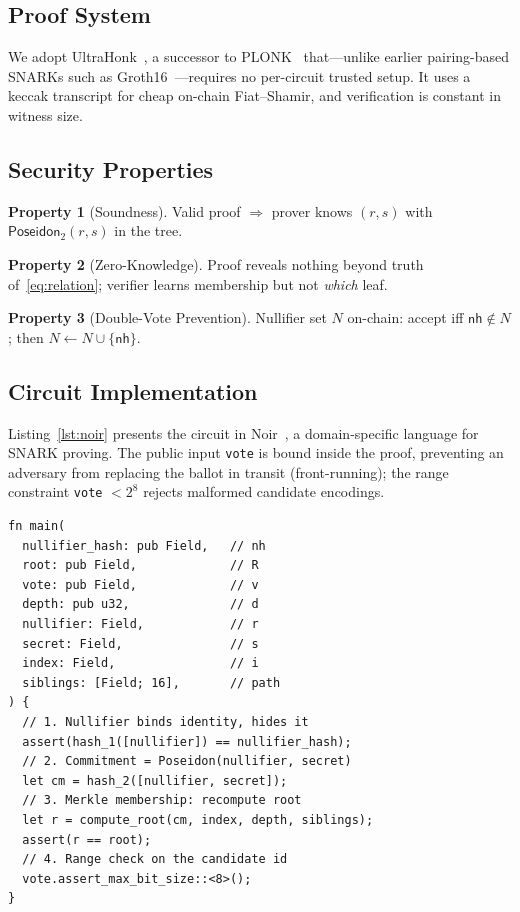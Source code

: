 \documentclass[conference]{IEEEtran}
\theoremstyle{definition}
\newtheorem{property}{Property}
\theoremstyle{plain}
\newcommand{\Poseidon}{\mathsf{Poseidon}}
\newcommand{\nullhash}{\mathsf{nh}}
\begin{document}
\subsection{Proof System}
We adopt UltraHonk~\cite{honk2023}, a successor to PLONK~\cite{plonk2019} that---unlike earlier pairing-based SNARKs such as Groth16~\cite{groth16}---requires no per-circuit trusted setup. It uses a keccak transcript for cheap on-chain Fiat--Shamir, and verification is constant in witness size.

\subsection{Security Properties}
\begin{property}[Soundness]
Valid proof $\Rightarrow$ prover knows $(r,s)$ with $\Poseidon_2(r,s)$ in the tree.
\end{property}
\begin{property}[Zero-Knowledge]
Proof reveals nothing beyond truth of~\eqref{eq:relation}; verifier learns membership but not \emph{which} leaf.
\end{property}
\begin{property}[Double-Vote Prevention]
Nullifier set $N$ on-chain: accept iff $\nullhash\notin N$; then $N\gets N\cup\{\nullhash\}$.
\end{property}

\subsection{Circuit Implementation}
Listing~\ref{lst:noir} presents the circuit in Noir~\cite{noir2023}, a domain-specific language for SNARK proving. The public input \texttt{vote} is bound inside the proof, preventing an adversary from replacing the ballot in transit (front-running); the range constraint \texttt{vote} $<2^8$ rejects malformed candidate encodings.

\begin{lstlisting}[morekeywords={fn,pub,let,assert,Field,u32}, caption={Noir circuit enforcing relation~\eqref{eq:relation}.}, label={lst:noir}]
fn main(
  nullifier_hash: pub Field,   // nh
  root: pub Field,             // R
  vote: pub Field,             // v
  depth: pub u32,              // d
  nullifier: Field,            // r
  secret: Field,               // s
  index: Field,                // i
  siblings: [Field; 16],       // path
) {
  // 1. Nullifier binds identity, hides it
  assert(hash_1([nullifier]) == nullifier_hash);
  // 2. Commitment = Poseidon(nullifier, secret)
  let cm = hash_2([nullifier, secret]);
  // 3. Merkle membership: recompute root
  let r = compute_root(cm, index, depth, siblings);
  assert(r == root);
  // 4. Range check on the candidate id
  vote.assert_max_bit_size::<8>();
}
\end{lstlisting}
\end{document}
